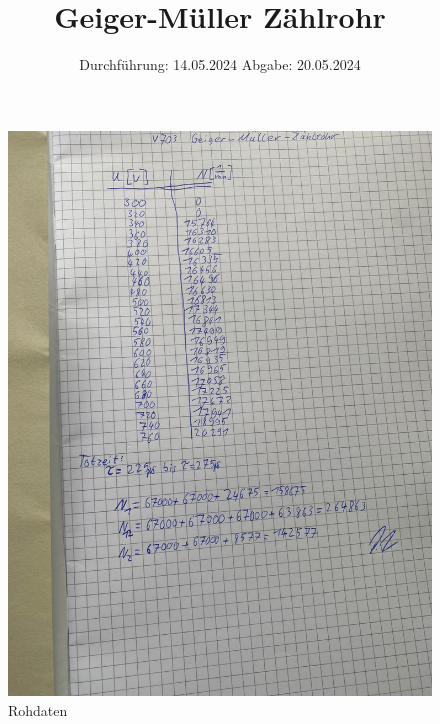 

\subject{V703}
\title{Geiger-Müller Zählrohr}
\date{%
  Durchführung: 14.05.2024
  \hspace{3em}
  Abgabe: 20.05.2024
}



\maketitle
\thispagestyle{empty}
\tableofcontents
\newpage







\newpage
\printbibliography{}
\newpage

\begin{figure}[H]
  \includegraphics[width=\textwidth]{Bilder/rohdaten.jpg}
  \caption{Rohdaten}
\end{figure}


